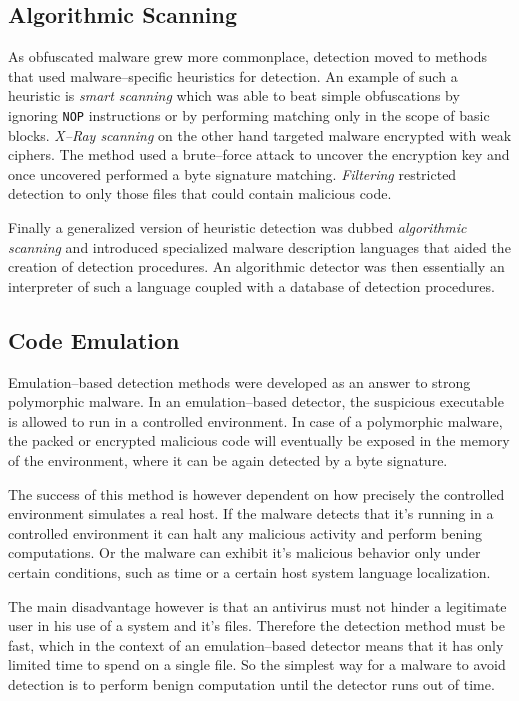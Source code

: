 \subsection{Algorithmic Scanning}
As obfuscated malware grew more commonplace, detection moved to methods that used malware--specific heuristics for detection. An example of such a heuristic is \emph{smart scanning} which was able to beat simple obfuscations by ignoring \texttt{NOP} instructions or by performing matching only in the scope of basic blocks. \emph{X--Ray scanning} on the other hand targeted malware encrypted with weak ciphers. The method used a brute--force attack to uncover the encryption key and once uncovered performed a byte signature matching. \emph{Filtering} restricted detection to only those files that could contain malicious code.

Finally a generalized version of heuristic detection was dubbed \emph{algorithmic scanning} and introduced specialized malware description languages that aided the creation of detection procedures. An algorithmic detector was then essentially an interpreter of such a language coupled with a database of detection procedures.

\subsection{Code Emulation}
Emulation--based detection methods were developed as an answer to strong polymorphic malware. In an emulation--based detector, the suspicious executable is allowed to run in a controlled environment. In case of a polymorphic malware, the packed or encrypted malicious code will eventually be exposed in the memory of the environment, where it can be again detected by a byte signature.

The success of this method is however dependent on how precisely the controlled environment simulates a real host. If the malware detects that it's running in a controlled environment it can halt any malicious activity and perform bening computations. Or the malware can exhibit it's malicious behavior only under certain conditions, such as time or a certain host system language localization.

The main disadvantage however is that an antivirus must not hinder a legitimate user in his use of a system and it's files. Therefore the detection method must be fast, which in the context of an emulation--based detector means that it has only limited time to spend on a single file. So the simplest way for a malware to avoid detection is to perform benign computation until the detector runs out of time.

